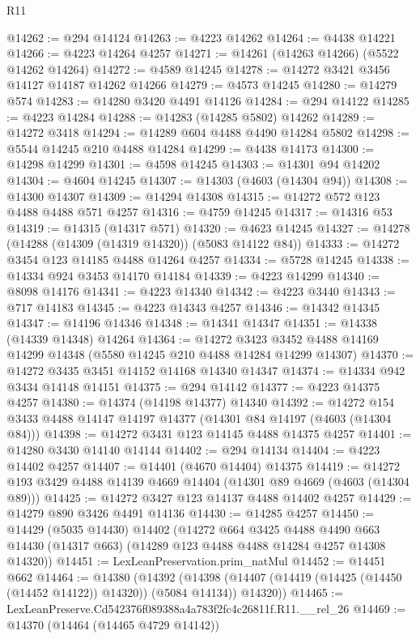 \begin{lexlean}{R11}
\begin{coremodule}
@14262 := @294 @14124
@14263 := @4223 @14262
@14264 := @4438 @14221
@14266 := @4223 @14264 @4257
@14271 := @14261 (@14263 @14266) (@5522 @14262 @14264)
@14272 := @4589 @14245
@14278 := @14272 @3421 @3456 @14127 @14187 @14262 @14266
@14279 := @4573 @14245
@14280 := @14279 @574
@14283 := @14280 @3420 @4491 @14126
@14284 := @294 @14122
@14285 := @4223 @14284
@14288 := @14283 (@14285 @5802) @14262
@14289 := @14272 @3418
@14294 := @14289 @604 @4488 @4490 @14284 @5802
@14298 := @5544 @14245 @210 @4488 @14284
@14299 := @4438 @14173
@14300 := @14298 @14299
@14301 := @4598 @14245
@14303 := @14301 @94 @14202
@14304 := @4604 @14245
@14307 := @14303 (@4603 (@14304 @94))
@14308 := @14300 @14307
@14309 := @14294 @14308
@14315 := @14272 @572 @123 @4488 @4488 @571 @4257
@14316 := @4759 @14245
@14317 := @14316 @53
@14319 := @14315 (@14317 @571)
@14320 := @4623 @14245
@14327 := @14278 (@14288 (@14309 (@14319 @14320)) (@5083 @14122 @84))
@14333 := @14272 @3454 @123 @14185 @4488 @14264 @4257
@14334 := @5728 @14245
@14338 := @14334 @924 @3453 @14170 @14184
@14339 := @4223 @14299
@14340 := @8098 @14176
@14341 := @4223 @14340
@14342 := @4223 @3440
@14343 := @717 @14183
@14345 := @4223 @14343 @4257
@14346 := @14342 @14345
@14347 := @14196 @14346
@14348 := @14341 @14347
@14351 := @14338 (@14339 @14348) @14264
@14364 := @14272
    @3423
    @3452
    @4488
    @14169
    @14299
    @14348
    (@5580 @14245 @210 @4488 @14284 @14299 @14307)
@14370 := @14272 @3435 @3451 @14152 @14168 @14340 @14347
@14374 := @14334 @942 @3434 @14148 @14151
@14375 := @294 @14142
@14377 := @4223 @14375 @4257
@14380 := @14374 (@14198 @14377) @14340
@14392 := @14272 @154 @3433 @4488 @14147 @14197 @14377 (@14301 @84 @14197 (@4603 (@14304 @84)))
@14398 := @14272 @3431 @123 @14145 @4488 @14375 @4257
@14401 := @14280 @3430 @14140 @14144
@14402 := @294 @14134
@14404 := @4223 @14402 @4257
@14407 := @14401 (@4670 @14404) @14375
@14419 := @14272 @193 @3429 @4488 @14139 @4669 @14404 (@14301 @89 @4669 (@4603 (@14304 @89)))
@14425 := @14272 @3427 @123 @14137 @4488 @14402 @4257
@14429 := @14279 @890 @3426 @4491 @14136
@14430 := @14285 @4257
@14450 := @14429
    (@5035 @14430)
    @14402
    (@14272
      @664
      @3425
      @4488
      @4490
      @663
      @14430
      (@14317 @663)
      (@14289 @123 @4488 @4488 @14284 @4257 @14308 @14320))
@14451 := LexLeanPreservation.prim_natMul
@14452 := @14451 @662
@14464 := @14380
    (@14392
      (@14398 (@14407 (@14419 (@14425 (@14450 (@14452 @14122)) @14320)) (@5084 @14134)) @14320))
@14465 := LexLeanPreserve.Cd542376f089388a4a783f2fc4c26811f.R11.__rel_26
@14469 := @14370 (@14464 (@14465 @4729 @14142))

\end{coremodule}
\end{lexlean}
